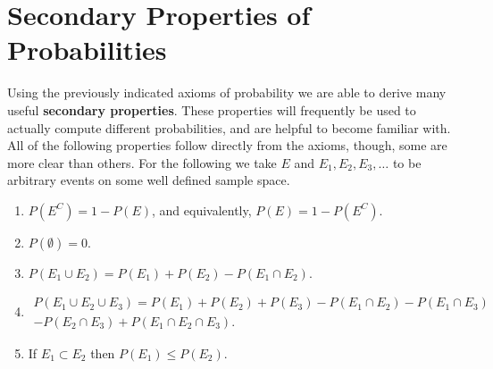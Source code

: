 \documentclass[
  letterpaper,
  DIV=11,
  numbers=noendperiod]{scrreprt}
\providecommand{\tightlist}{%
  \setlength{\itemsep}{0pt}\setlength{\parskip}{0pt}}\usepackage{longtable,booktabs,array}
\theoremstyle{definition}
\theoremstyle{definition}
\theoremstyle{definition}
\theoremstyle{remark}
\begin{document}
\section{Secondary Properties of
Probabilities}\label{secondary-properties-of-probabilities}

Using the previously indicated axioms of probability we are able to
derive many useful \textbf{secondary properties}. These properties will
frequently be used to actually compute different probabilities, and are
helpful to become familiar with. All of the following properties follow
directly from the axioms, though, some are more clear than others. For
the following we take \(E\) and \(E_1,E_2,E_3,\dots\) to be arbitrary
events on some well defined sample space.

\begin{enumerate}
\def\labelenumi{\arabic{enumi}.}
\tightlist
\item
  \(P(E^C) = 1-P(E)\), and equivalently, \(P(E) = 1 - P(E^C)\).
\item
  \(P(\emptyset) = 0\).
\item
  \(P(E_1 \cup E_2) = P(E_1) + P(E_2) - P(E_1\cap E_2)\).
\item
  \begin{multline*}P(E_1 \cup E_2 \cup E_3) = P(E_1) + P(E_2) + P(E_3) - P(E_1\cap E_2) - P(E_1 \cap E_3) \\ - P(E_2 \cap E_3) + P(E_1 \cap E_2 \cap E_3).\end{multline*}
\item
  If \(E_1 \subset E_2\) then \(P(E_1) \leq P(E_2)\).
\end{enumerate}
\end{document}
